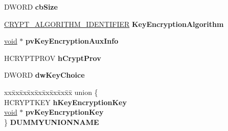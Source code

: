 \begin{DoxyCompactItemize}
\item 
\mbox{\label{struct___c_m_s_g___m_a_i_l___l_i_s_t___r_e_c_i_p_i_e_n_t___e_n_c_o_d_e___i_n_f_o_af637f29dc30ec1b00cb911934e9e5e84}} 
D\+W\+O\+RD {\bfseries cb\+Size}
\item 
\mbox{\label{struct___c_m_s_g___m_a_i_l___l_i_s_t___r_e_c_i_p_i_e_n_t___e_n_c_o_d_e___i_n_f_o_aaec9f3acb7daaa2f6337050756f64dbf}} 
\hyperlink{struct___c_r_y_p_t___a_l_g_o_r_i_t_h_m___i_d_e_n_t_i_f_i_e_r}{C\+R\+Y\+P\+T\+\_\+\+A\+L\+G\+O\+R\+I\+T\+H\+M\+\_\+\+I\+D\+E\+N\+T\+I\+F\+I\+ER} {\bfseries Key\+Encryption\+Algorithm}
\item 
\mbox{\label{struct___c_m_s_g___m_a_i_l___l_i_s_t___r_e_c_i_p_i_e_n_t___e_n_c_o_d_e___i_n_f_o_a840ba24299b2b6dbb2781c9ae7b55d68}} 
\hyperlink{interfacevoid}{void} $\ast$ {\bfseries pv\+Key\+Encryption\+Aux\+Info}
\item 
\mbox{\label{struct___c_m_s_g___m_a_i_l___l_i_s_t___r_e_c_i_p_i_e_n_t___e_n_c_o_d_e___i_n_f_o_ac67dd978b7e284a0a8f661e613d82954}} 
H\+C\+R\+Y\+P\+T\+P\+R\+OV {\bfseries h\+Crypt\+Prov}
\item 
\mbox{\label{struct___c_m_s_g___m_a_i_l___l_i_s_t___r_e_c_i_p_i_e_n_t___e_n_c_o_d_e___i_n_f_o_a369cd524f85a72949118c6461411b324}} 
D\+W\+O\+RD {\bfseries dw\+Key\+Choice}
\item 
\mbox{\label{struct___c_m_s_g___m_a_i_l___l_i_s_t___r_e_c_i_p_i_e_n_t___e_n_c_o_d_e___i_n_f_o_a0591385cff0a775d8a4ef77b6e33fdc5}} 
\begin{tabbing}
xx\=xx\=xx\=xx\=xx\=xx\=xx\=xx\=xx\=\kill
union \{\\
\>HCRYPTKEY {\bfseries hKeyEncryptionKey}\\
\>\hyperlink{interfacevoid}{void} $\ast$ {\bfseries pvKeyEncryptionKey}\\
\} {\bfseries DUMMYUNIONNAME}\\


\end{tabbing}
\end{DoxyCompactItemize}
